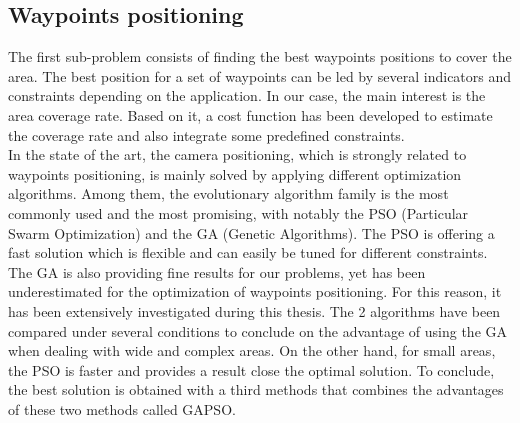 \subsection{Waypoints positioning}
The first sub-problem consists of finding the best waypoints positions to cover the area. 
The best position for a set of waypoints can be led by several indicators and constraints depending on the application. In our case, the main interest is the area coverage rate. Based on it, a cost function has been developed to estimate the coverage rate and also integrate some predefined constraints.\\
In the state of the art, the camera positioning, which is strongly related to waypoints positioning, is mainly solved by applying different optimization algorithms.  
Among them, the evolutionary algorithm family is the most commonly used and the most promising, with notably the PSO (Particular Swarm Optimization) and the GA (Genetic Algorithms).
The PSO is offering a fast solution which is flexible and can easily be tuned for different constraints.
The GA is also providing fine results for our problems, yet has been underestimated for the optimization of waypoints positioning. For this reason, it has been extensively investigated during this thesis. 
The 2 algorithms have been compared under several conditions to conclude on the advantage of using the GA when dealing with wide and complex areas. On the other hand, for small areas, the PSO is faster and provides a result close the optimal solution.
To conclude, the best solution is obtained with a third methods that combines the advantages of these two methods called GAPSO. \\

